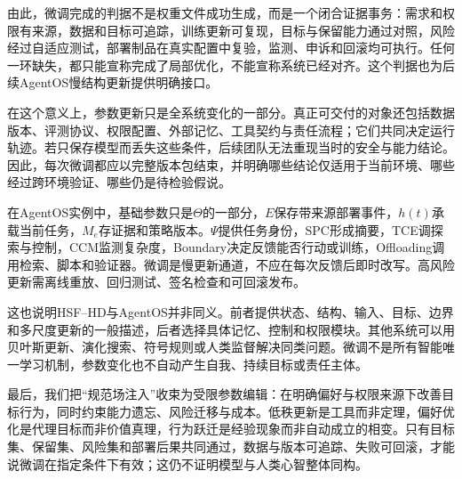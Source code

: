 由此，微调完成的判据不是权重文件成功生成，而是一个闭合证据事务：需求和权限有来源，数据和目标可追踪，训练更新可复现，目标与保留能力通过对照，风险经过自适应测试，部署制品在真实配置中复验，监测、申诉和回滚均可执行。任何一环缺失，都只能宣称完成了局部优化，不能宣称系统已经对齐。这个判据也为后续AgentOS慢结构更新提供明确接口。

在这个意义上，参数更新只是全系统变化的一部分。真正可交付的对象还包括数据版本、评测协议、权限配置、外部记忆、工具契约与责任流程；它们共同决定运行轨迹。若只保存模型而丢失这些条件，后续团队无法重现当时的安全与能力结论。因此，每次微调都应以完整版本包结束，并明确哪些结论仅适用于当前环境、哪些经过跨环境验证、哪些仍是待检验假说。

在AgentOS实例中，基础参数只是$\Theta$的一部分，$E$保存带来源部署事件，$h(t)$承载当前任务，$M_e$存证据和策略版本。$\Psi$提供任务身份，SPC形成摘要，TCE调探索与控制，CCM监测复杂度，Boundary决定反馈能否行动或训练，Offloading调用检索、脚本和验证器。微调是慢更新通道，不应在每次反馈后即时改写。高风险更新需离线重放、回归测试、签名检查和可回滚发布。

这也说明HSF--HD与AgentOS并非同义。前者提供状态、结构、输入、目标、边界和多尺度更新的一般描述，后者选择具体记忆、控制和权限模块。其他系统可以用贝叶斯更新、演化搜索、符号规则或人类监督解决同类问题。微调不是所有智能唯一学习机制，参数变化也不自动产生自我、持续目标或责任主体。

最后，我们把“规范场注入”收束为受限参数编辑：在明确偏好与权限来源下改善目标行为，同时约束能力遗忘、风险迁移与成本。低秩更新是工具而非定理，偏好优化是代理目标而非价值真理，行为跃迁是经验现象而非自动成立的相变。只有目标集、保留集、风险集和部署后果共同通过，数据与版本可追踪、失败可回滚，才能说微调在指定条件下有效；这仍不证明模型与人类心智整体同构。

